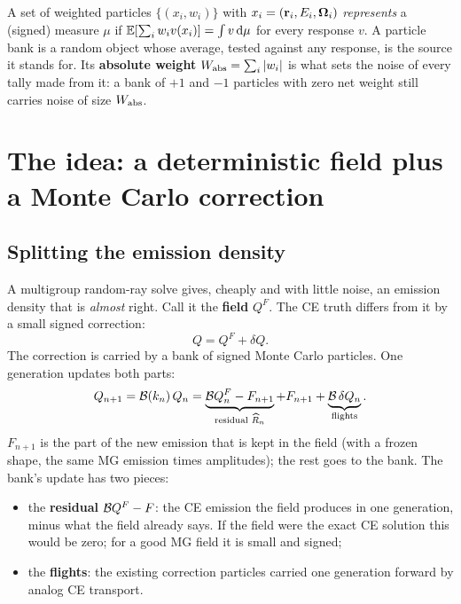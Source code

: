 A set of weighted particles $\{(x_i,w_i)\}$ with $x_i=(\mathbf r_i,E_i,\boldsymbol\Omega_i)$ \emph{represents} a
(signed) measure $\mu$ if $\mathbb E[\sum_iw_iv(x_i)]=\int v\,\mathrm d\mu$ for every response $v$. A particle bank
is a random object whose average, tested against any response, is the source it stands for. Its
\textbf{absolute weight} $W_{\mathrm{abs}}=\sum_i|w_i|$ is what sets the noise of every tally made from it: a
bank of $+1$ and $-1$ particles with zero net weight still carries noise of size $W_{\mathrm{abs}}$.

\section{The idea: a deterministic field plus a Monte Carlo correction}\label{sec:idea}

\subsection{Splitting the emission density}

A multigroup random-ray solve gives, cheaply and with little noise, an emission density that is
\emph{almost} right. Call it the \textbf{field} $Q^F$. The CE truth differs from it by a small signed
correction:
\begin{equation}
Q = Q^F + \delta Q .
\end{equation}
The correction is carried by a bank of signed Monte Carlo particles. One generation updates both
parts:
\begin{equation}\label{eq:update}
Q_{n+1} = \mathcal B(k_n)\,Q_n = \underbrace{\mathcal B Q^F_n - F_{n+1}}_{\text{residual }\widehat R_n} + F_{n+1}
 + \underbrace{\mathcal B\,\delta Q_n}_{\text{flights}} .
\end{equation}
$F_{n+1}$ is the part of the new emission that is kept in the field (with a frozen shape, the same
MG emission times amplitudes); the rest goes to the bank. The bank's update has two pieces:
\begin{itemize}
\item the \textbf{residual} $\mathcal B Q^F - F$: the CE emission the field produces in one generation,
  minus what the field already says. If the field were the exact CE solution this would be zero;
  for a good MG field it is small and signed;
\item the \textbf{flights}: the existing correction particles carried one generation forward by
  analog CE transport.
\end{itemize}

